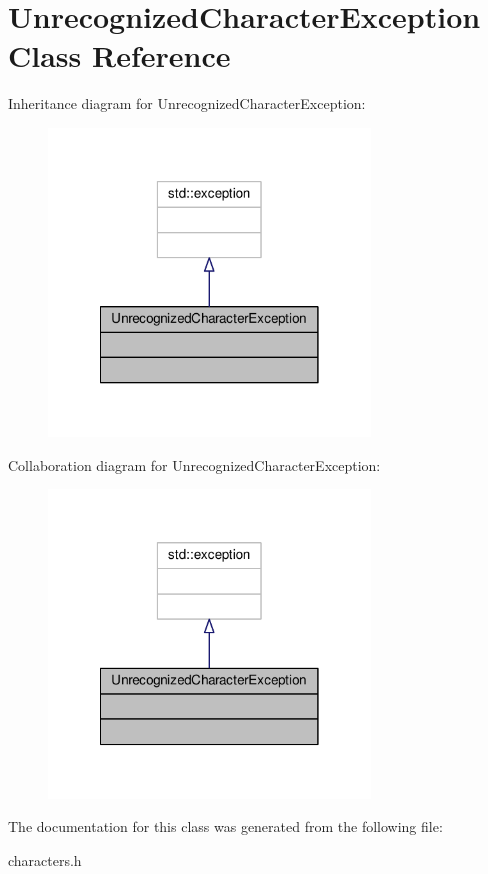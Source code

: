 \hypertarget{class_unrecognized_character_exception}{\section{Unrecognized\-Character\-Exception Class Reference}
\label{class_unrecognized_character_exception}
}


Inheritance diagram for Unrecognized\-Character\-Exception\-:
\nopagebreak
\begin{figure}[H]
\begin{center}
\leavevmode
\includegraphics[width=242pt]{class_unrecognized_character_exception__inherit__graph}
\end{center}
\end{figure}


Collaboration diagram for Unrecognized\-Character\-Exception\-:
\nopagebreak
\begin{figure}[H]
\begin{center}
\leavevmode
\includegraphics[width=242pt]{class_unrecognized_character_exception__coll__graph}
\end{center}
\end{figure}


The documentation for this class was generated from the following file\-:\begin{DoxyCompactItemize}
\item 
characters.\-h\end{DoxyCompactItemize}
